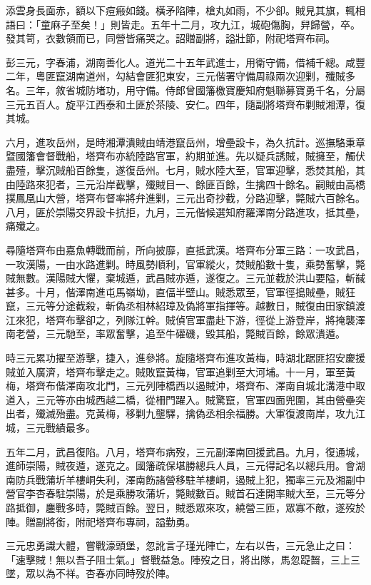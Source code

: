 \begin{pinyinscope}
添雲身長面赤，額以下痘瘢如錢。橫矛陷陣，槍丸如雨，不少卻。賊見其旗，輒相語曰：「童麻子至矣！」則皆走。五年十二月，攻九江，城砲傷胸，舁歸營，卒。發其笥，衣數領而已，同營皆痛哭之。詔贈副將，謚壯節，附祀塔齊布祠。

彭三元，字春浦，湖南善化人。道光二十五年武進士，用衛守備，借補千總。咸豐二年，粵匪竄湖南道州，勾結會匪犯東安，三元偕署守備周祿兩次迎剿，殲賊多名。三年，敘省城防堵功，用守備。侍郎曾國籓檄寶慶知府魁聯募寶勇千名，分屬三元五百人。旋平江西泰和土匪於茶陵、安仁。四年，隨副將塔齊布剿賊湘潭，復其城。

六月，進攻岳州，是時湘潭潰賊由靖港竄岳州，增壘設卡，為久抗計。巡撫駱秉章暨國籓會督戰船，塔齊布亦統陸路官軍，約期並進。先以疑兵誘賊，賊擁至，觸伏盡殪，擊沉賊船百餘隻，遂復岳州。七月，賊水陸大至，官軍迎擊，悉焚其船，其由陸路來犯者，三元沿岸截擊，殲賊目一、餘匪百餘，生擒四十餘名。嗣賊由高橋撲鳳凰山大營，塔齊布督率將弁進剿，三元出奇抄截，分路迎擊，斃賊六百餘名。八月，匪於崇陽交界設卡抗拒，九月，三元偕候選知府羅澤南分路進攻，抵其壘，痛殲之。

尋隨塔齊布由嘉魚轉戰而前，所向披靡，直抵武漢。塔齊布分軍三路：一攻武昌，一攻漢陽，一由水路進剿。時風勢順利，官軍縱火，焚賊船數十隻，乘勢奮擊，斃賊無數。漢陽賊大懼，棄城遁，武昌賊亦遁，遂復之。三元並截於洪山要隘，斬馘甚多。十月，偕澤南進屯馬嶺坳，直偪半壁山。賊悉眾至，官軍徑搗賊壘，賊狂竄，三元等分途截殺，斬偽丞相林紹璋及偽將軍指揮等。越數日，賊復由田家鎮渡江來犯，塔齊布擊卻之，列隊江幹。賊偵官軍盡赴下游，徑從上游登岸，將掩襲澤南老營，三元馳至，率眾奮擊，追至牛礶磯，毀其船，斃賊百餘，餘眾潰遁。

時三元累功擢至游擊，捷入，進參將。旋隨塔齊布進攻黃梅，時湖北踞匪招安慶援賊並入廣濟，塔齊布擊走之。賊敗竄黃梅，官軍追剿至大河埔。十一月，軍至黃梅，塔齊布偕澤南攻北門，三元列陣橋西以遏賊沖，塔齊布、澤南自城北溝港中取道入，三元等亦由城西越二橋，從柵門躍入。賊驚竄，官軍四面兜圍，其由營壘突出者，殲滅殆盡。克黃梅，移剿九壟驛，擒偽丞相余福勝。大軍復渡南岸，攻九江城，三元戰績最多。

五年二月，武昌復陷。八月，塔齊布病歿，三元副澤南回援武昌。九月，復通城，進師崇陽，賊夜遁，遂克之。國籓疏保堪勝總兵人員，三元得記名以總兵用。會湖南防兵戰蒲圻羊樓峒失利，澤南飭諸營移駐羊樓峒，遏賊上犯，獨率三元及湘副中營官李杏春駐崇陽，於是乘勝攻蒲圻，斃賊數百。賊首石達開率賊大至，三元等分路抵御，鏖戰多時，斃賊百餘。翌日，賊悉眾來攻，繞營三匝，眾寡不敵，遂歿於陣。贈副將銜，附祀塔齊布專祠，謚勤勇。

三元忠勇識大體，嘗戰濠頭堡，忽訛言子瑾光陣亡，左右以告，三元急止之曰：「速擊賊！無以吾子阻士氣。」督戰益急。陣歿之日，將出隊，馬忽踶齧，三上三墜，眾以為不祥。杏春亦同時歿於陣。


\end{pinyinscope}
